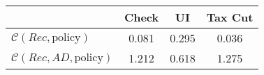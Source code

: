 \begin{tabular}{@{}lccc@{}} 
\toprule 
                          & Check      & UI    & Tax Cut    \\  \midrule 
$\mathcal{C}(Rec,\text{policy})$ & 0.081  & 0.295  & 0.036     \\ 
$\mathcal{C}(Rec, AD,\text{policy})$ & 1.212  & 0.618  & 1.275     \\ 
\end{tabular}  
